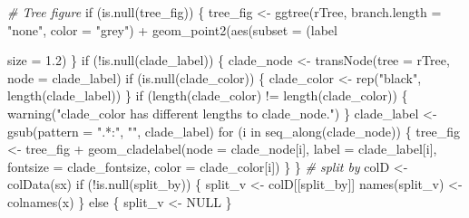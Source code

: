 \documentclass[]{article}
\newcommand{\hlnum}[1]{\textcolor[rgb]{0.816,0.125,0.439}{#1}}%
\newcommand{\hlstr}[1]{\textcolor[rgb]{0.251,0.627,0.251}{#1}}%
\newcommand{\hlcom}[1]{\textcolor[rgb]{0.502,0.502,0.502}{\textit{#1}}}%
\newcommand{\hlopt}[1]{\textcolor[rgb]{0,0,0}{#1}}%
\newcommand{\hlstd}[1]{\textcolor[rgb]{0.251,0.251,0.251}{#1}}%
\newcommand{\hlkwc}[1]{\textcolor[rgb]{0.251,0.251,0.251}{#1}}%
\newcommand{\hlkwd}[1]{\textcolor[rgb]{0.878,0.439,0.125}{#1}}%
\newenvironment{Shaded}{\begin{myshaded}}{\end{myshaded}}
\newcommand{\KeywordTok}[1]{\hlkwd{#1}}
\newcommand{\DataTypeTok}[1]{\hlkwc{#1}}
\newcommand{\FloatTok}[1]{\hlnum{#1}}
\newcommand{\StringTok}[1]{\hlstr{#1}}
\newcommand{\CommentTok}[1]{\hlcom{#1}}
\newcommand{\OtherTok}[1]{{#1}}
\newcommand{\ControlFlowTok}[1]{\hlkwd{#1}}
\newcommand{\OperatorTok}[1]{\hlopt{#1}}
\newcommand{\NormalTok}[1]{\hlstd{#1}}
\begin{document}
\begin{Shaded}
\begin{Highlighting}[]
  \CommentTok{# Tree figure}
  \ControlFlowTok{if}\NormalTok{ (}\KeywordTok{is.null}\NormalTok{(tree_fig)) \{}
\NormalTok{    tree_fig <-}\StringTok{ }\KeywordTok{ggtree}\NormalTok{(rTree, }\DataTypeTok{branch.length =} \StringTok{"none"}\NormalTok{, }\DataTypeTok{color =} \StringTok{"grey"}\NormalTok{) }\OperatorTok{+}
\StringTok{      }\KeywordTok{geom_point2}\NormalTok{(}\KeywordTok{aes}\NormalTok{(}\DataTypeTok{subset =}\NormalTok{ (label }\OperatorTok{%
                  \DataTypeTok{size =} \FloatTok{1.2}\NormalTok{) }
\NormalTok{  \}}
  \ControlFlowTok{if}\NormalTok{ (}\OperatorTok{!}\KeywordTok{is.null}\NormalTok{(clade_label)) \{}
\NormalTok{     clade_node <-}\StringTok{ }\KeywordTok{transNode}\NormalTok{(}\DataTypeTok{tree =}\NormalTok{ rTree, }\DataTypeTok{node =}\NormalTok{ clade_label)}
     \ControlFlowTok{if}\NormalTok{ (}\KeywordTok{is.null}\NormalTok{(clade_color)) \{}
\NormalTok{       clade_color <-}\StringTok{ }\KeywordTok{rep}\NormalTok{(}\StringTok{"black"}\NormalTok{, }\KeywordTok{length}\NormalTok{(clade_label))}
\NormalTok{     \}}
     \ControlFlowTok{if}\NormalTok{ (}\KeywordTok{length}\NormalTok{(clade_color) }\OperatorTok{!=}\StringTok{ }\KeywordTok{length}\NormalTok{(clade_color)) \{}
       \KeywordTok{warning}\NormalTok{(}\StringTok{"clade_color has different lengths to clade_node."}\NormalTok{)}
\NormalTok{     \}}
\NormalTok{     clade_label <-}\StringTok{ }\KeywordTok{gsub}\NormalTok{(}\DataTypeTok{pattern =} \StringTok{".*:"}\NormalTok{, }\StringTok{""}\NormalTok{, clade_label)}
     \ControlFlowTok{for}\NormalTok{ (i }\ControlFlowTok{in} \KeywordTok{seq_along}\NormalTok{(clade_node)) \{}
\NormalTok{       tree_fig <-}\StringTok{ }\NormalTok{tree_fig }\OperatorTok{+}
\StringTok{         }\KeywordTok{geom_cladelabel}\NormalTok{(}\DataTypeTok{node  =}\NormalTok{ clade_node[i], }\DataTypeTok{label =}\NormalTok{ clade_label[i],}
                         \DataTypeTok{fontsize =}\NormalTok{ clade_fontsize, }\DataTypeTok{color =}\NormalTok{ clade_color[i])}
\NormalTok{     \}}
\NormalTok{  \}}
  \CommentTok{# split by}
\NormalTok{  colD <-}\StringTok{ }\KeywordTok{colData}\NormalTok{(sx)}
  \ControlFlowTok{if}\NormalTok{ (}\OperatorTok{!}\KeywordTok{is.null}\NormalTok{(split_by)) \{}
\NormalTok{    split_v <-}\StringTok{ }\NormalTok{colD[[split_by]]}
    \KeywordTok{names}\NormalTok{(split_v) <-}\StringTok{ }\KeywordTok{colnames}\NormalTok{(x)}
\NormalTok{  \} }\ControlFlowTok{else}\NormalTok{ \{}
\NormalTok{    split_v <-}\StringTok{ }\OtherTok{NULL}
\NormalTok{  \}}
  
}
\end{Highlighting}
\end{Shaded}
\end{document}
